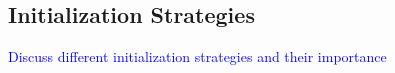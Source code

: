 \subsection{Initialization Strategies}

\textcolor{blue}{Discuss different initialization strategies and their importance}